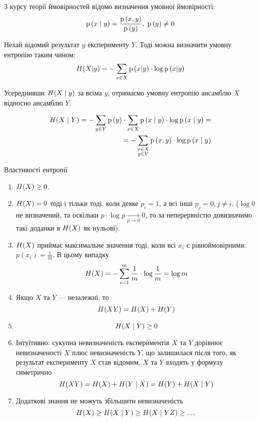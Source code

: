 З курсу теорії ймовірностей відомо визначення умовної ймовірності:
$$\mathrm{p}\left(x \;\middle|\; y\right) = \frac{\mathrm{p}\left(x,y\right)}{\mathrm{p}\left(y\right)},\; \mathrm{p}\left(y\right)\neq 0$$

Нехай відомий результат $y$ експерименту $Y$. Тоді можна визначити умовну
ентропію таким чином:
$$H\!\left( X|y \right) = -\sum_{x\in X} \mathrm{p}\left(x|y\right) \cdot \log\mathrm{p}\left(x|y\right)$$

Усереднивши  $H\!\left( X \;\middle|\; y \right)$ за всіма  $y$,
отримаємо умовну ентропію ансамблю $X$ відносно ансамблю $Y$:

\begin{align*}
    H\!\left( X \;\middle|\; Y \right)
    = - \sum_{y \in Y} \mathrm{p}\left(y\right) \cdot \sum_{x \in X} \mathrm{p}\left(x \;\middle|\; y\right)
            \cdot \log{\mathrm{p}\left(x \;\middle|\;y\right)} = \\
    = - \sum_{\substack{x \in X \\ y \in Y}} \mathrm{p}\left(x, y\right)
            \cdot \log{\mathrm{p}\left(x \;\middle|\;y\right)}
\end{align*}

Властивості ентропії
\begin{enumerate}
    \item  $H\!\left( X \right) \ge 0$.
    \item  $H\!\left( X \right)=0$ тоді і тільки тоді, коли деяке  $p_i=1$, а всі інші 
        $p_j=0,j\neq i$. ($\log{0}$ не визначений, та оскільки  $p\cdot
        \log{p} \xrightarrow[p \to 0]{} 0$, то за неперервністю
        довизначимо такі доданки в $H\!\left( X \right)$ як нульові).
    \item $H\!\left( X \right)$ приймає максимальне значення тоді,
        коли всі $x_i$ є рівноймовірними:
        $p\left( x_i \right) = \frac{1}{m}$. В цьому випадку
        $$H\!\left( X \right)
            = -\sum_{i=1}^m \frac{1}{m} \cdot \log{\frac{1}{m}}
            =\log{m}$$
    \item Якщо $X$ та $Y$ --- незалежні, то
        $$H\!\left( XY \right) = H\!\left( X \right) + H\!\left( Y \right)$$
    \item $$H\!\left( X \;\middle|\; Y \right)\ge 0$$
    \item Інтуїтивно: сукупна невизначеність експериментів $X$ та $Y$
        дорівнює невизначеності $X$ плюс невизначеність $Y$, що
        залишилася після того, як результат експерименту $X$ став відомим.
        $X$ та $Y$ входять у формулу симетрично
        $$H\!\left( XY \right)
            = H\!\left( X \right)+H\!\left( Y \;\middle|\; X \right)
            = H\!\left( Y \right)+H\!\left( X \;\middle|\; Y \right)$$
    \item Додаткові знання не можуть збільшити невизначеність
        $$H\!\left( X \right)
            \ge H\!\left( X \;\middle|\; Y \right)
            \ge H\!\left( X \;\middle|\; YZ \right)
            \ge \dots$$
\end{enumerate}

